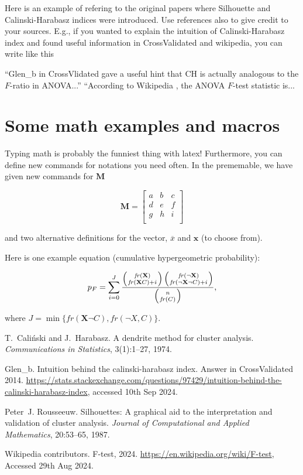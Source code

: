 \documentclass[a4paper,12pt]{article}
\newcommand{\Mmatr}{\ensuremath{\mathbf{M}}}
\newcommand{\xvec}{\ensuremath{\overline{x}}}
\newcommand{\xvecII}{\ensuremath{\mathbf{x}}} %
\newcommand{\Xset}{\ensuremath{\mathbf{X}}}
\newcommand{\fr}{\ensuremath{\mathit{fr}}} %
\begin{document}
Here is an example of refering to 
the original papers where Silhouette \cite{SI} and Calinski-Harabasz \cite{CH} indices were introduced. 
Use references also to give credit to your sources. E.g., if you 
wanted to explain the intuition of Calinski-Harabasz index 
and found useful information in CrossValidated and wikipedia, you can 
write like this

``Glen\_b in CrossVlidated \cite{glennCV} gave a useful hint that CH
is actually analogous to the $F$-ratio in ANOVA...'' ``According to Wikipedia \cite{Fwiki}, the ANOVA $F$-test statistic is...


\section{Some math examples and macros}

Typing math is probably the funniest thing with latex! Furthermore,
you can define new commands for notations you need often. In the
prememable, we have given new commands for $\Mmatr$ 

$$\Mmatr=\left[
\begin{array}{ccc}
a&b&c\\
d&e&f\\
g&h&i\\
\end{array}\right]$$

and two alternative definitions for the vector, $\xvec$ and $\xvecII$ (to choose from).

Here is one example equation (cumulative hypergeometric probability):

$$p_F=\sum_{i=0}^J\frac{\left(\fr(\Xset) \atop \fr(\Xset C)+i
  \right) \left(\fr(\neg \Xset) \atop \fr(\neg \Xset \neg C)+i \right)}{\left(
n
  \atop \fr(C)\right)},$$

where $J=\min\{\fr(\Xset\neg C),\fr(\neg X,C)\}$.

% 

% 

\begin{thebibliography}{1}

T.~Caliński and J.~Harabasz. A dendrite method for cluster analysis.
{\em Communications in Statistics}, 3(1):1--27, 1974.


Glen\_b. Intuition behind the calinski-harabasz index. Answer in CrossValidated 2014. 
\url{https://stats.stackexchange.com/questions/97429/intuition-behind-the-calinski-harabasz-index}, accessed 10th Sep 2024.

Peter~J. Rousseeuw. Silhouettes: A graphical aid to the interpretation and validation of cluster analysis. {\em Journal of Computational and Applied Mathematics}, 20:53--65, 1987.

Wikipedia contributors. F-test, 2024.
\url{https://en.wikipedia.org/wiki/F-test}, Accessed 29th Aug 2024.

\end{thebibliography}
\end{document}
